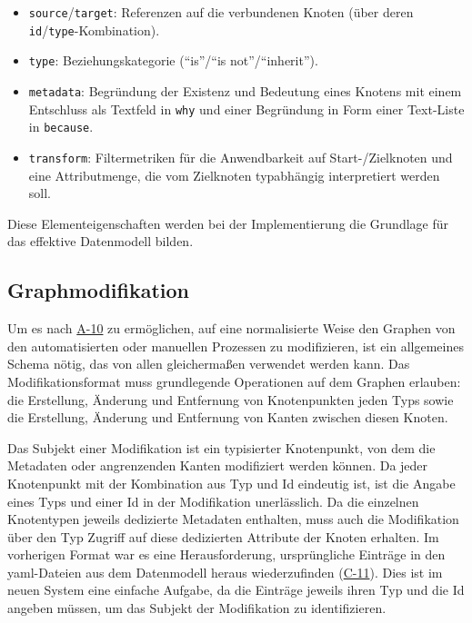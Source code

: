 \begin{itemize}
    \itemsep0em
    \item \texttt{source}/\texttt{target}: Referenzen auf die verbundenen Knoten (über deren \texttt{id}/\texttt{type}-Kombination).
    \item \texttt{type}: Beziehungskategorie (\enquote{is}/\enquote{is not}/\enquote{inherit}).
    \item \texttt{metadata}: Begründung der Existenz und Bedeutung eines Knotens mit einem Entschluss als Textfeld in \texttt{why} und einer Begründung in Form einer Text-Liste in \texttt{because}.
    \item \texttt{transform}: Filtermetriken für die Anwendbarkeit auf Start-/Zielknoten und eine Attributmenge, die vom Zielknoten typabhängig interpretiert werden soll.
\end{itemize}

Diese Elementeigenschaften werden bei der Implementierung die Grundlage für das effektive Datenmodell bilden.

\subsection{Graphmodifikation}\label{subsec:model-graph-modification}

Um es nach \hyperref[subsec:req-manual-format-modification]{A-10} zu ermöglichen, auf eine normalisierte Weise den Graphen von den automatisierten oder manuellen Prozessen zu modifizieren, ist ein allgemeines Schema nötig, das von allen gleichermaßen verwendet werden kann.
Das Modifikationsformat muss grundlegende Operationen auf dem Graphen erlauben: die Erstellung, Änderung und Entfernung von Knotenpunkten jeden Typs sowie die Erstellung, Änderung und Entfernung von Kanten zwischen diesen Knoten.

Das Subjekt einer Modifikation ist ein typisierter Knotenpunkt, von dem die Metadaten oder angrenzenden Kanten modifiziert werden können.
Da jeder Knotenpunkt mit der Kombination aus Typ und Id eindeutig ist, ist die Angabe eines Typs und einer Id in der Modifikation unerlässlich.
Da die einzelnen Knotentypen jeweils dedizierte Metadaten enthalten, muss auch die Modifikation über den Typ Zugriff auf diese dedizierten Attribute der Knoten erhalten.
Im vorherigen Format war es eine Herausforderung, ursprüngliche Einträge in den \acrshort{yaml}-Dateien aus dem Datenmodell heraus wiederzufinden (\hyperref[subsec:c-11-finding-yaml-entries]{C-11}).
Dies ist im neuen System eine einfache Aufgabe, da die Einträge jeweils ihren Typ und die Id angeben müssen, um das Subjekt der Modifikation zu identifizieren.

